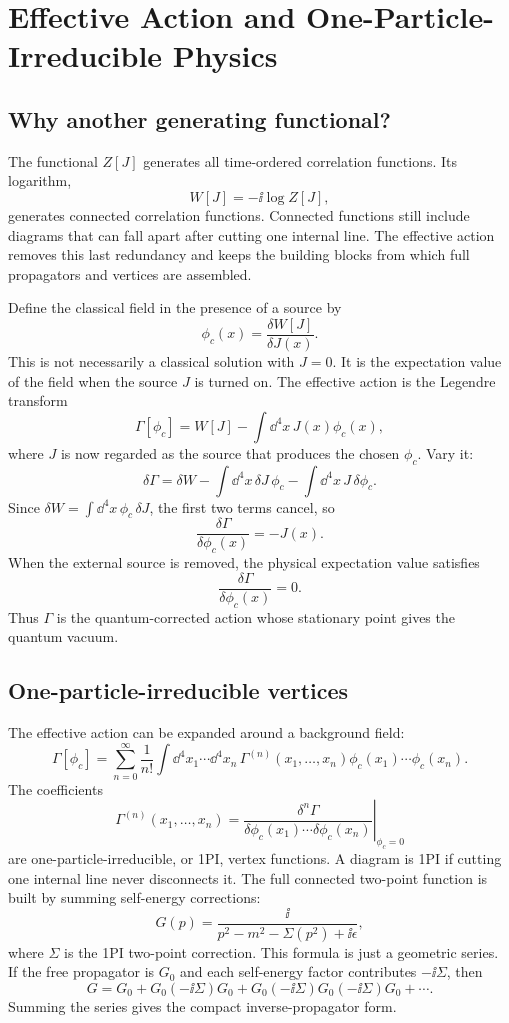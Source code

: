 \chapter{Effective Action and One-Particle-Irreducible Physics}

\section{Why another generating functional?}

The functional \(Z[J]\) generates all time-ordered correlation functions.  Its logarithm,
\[
  W[J]=-\ii\log Z[J],
\]
generates connected correlation functions.  Connected functions still include diagrams that can fall apart after cutting one internal line.  The effective action removes this last redundancy and keeps the building blocks from which full propagators and vertices are assembled.

Define the classical field in the presence of a source by
\[
  \phi_c(x)=\frac{\delta W[J]}{\delta J(x)}.
\]
This is not necessarily a classical solution with \(J=0\).  It is the expectation value of the field when the source \(J\) is turned on.  The effective action is the Legendre transform
\[
  \Gamma[\phi_c]=W[J]-\int\dd^4x\,J(x)\phi_c(x),
\]
where \(J\) is now regarded as the source that produces the chosen \(\phi_c\).  Vary it:
\[
  \delta\Gamma
  =
  \delta W-\int\dd^4x\,\delta J\,\phi_c-\int\dd^4x\,J\,\delta\phi_c.
\]
Since \(\delta W=\int\dd^4x\,\phi_c\,\delta J\), the first two terms cancel, so
\[
  \frac{\delta\Gamma}{\delta\phi_c(x)}=-J(x).
\]
When the external source is removed, the physical expectation value satisfies
\[
  \frac{\delta\Gamma}{\delta\phi_c(x)}=0.
\]
Thus \(\Gamma\) is the quantum-corrected action whose stationary point gives the quantum vacuum.

\section{One-particle-irreducible vertices}

The effective action can be expanded around a background field:
\[
  \Gamma[\phi_c]
  =
  \sum_{n=0}^{\infty}\frac1{n!}
  \int\dd^4x_1\cdots\dd^4x_n\,
  \Gamma^{(n)}(x_1,\ldots,x_n)
  \phi_c(x_1)\cdots\phi_c(x_n).
\]
The coefficients
\[
  \Gamma^{(n)}(x_1,\ldots,x_n)
  =
  \left.
  \frac{\delta^n\Gamma}{\delta\phi_c(x_1)\cdots\delta\phi_c(x_n)}
  \right|_{\phi_c=0}
\]
are one-particle-irreducible, or 1PI, vertex functions.  A diagram is 1PI if cutting one internal line never disconnects it.  The full connected two-point function is built by summing self-energy corrections:
\[
  G(p)=\frac{\ii}{p^2-m^2-\Sigma(p^2)+\ii\epsilon},
\]
where \(\Sigma\) is the 1PI two-point correction.  This formula is just a geometric series.  If the free propagator is \(G_0\) and each self-energy factor contributes \(-\ii\Sigma\), then
\[
  G=G_0+G_0(-\ii\Sigma)G_0+G_0(-\ii\Sigma)G_0(-\ii\Sigma)G_0+\cdots.
\]
Summing the series gives the compact inverse-propagator form.

